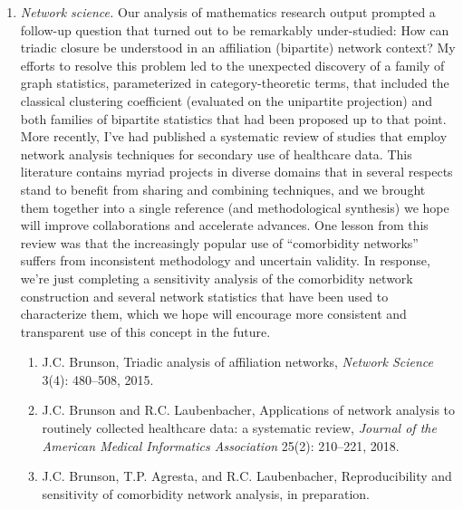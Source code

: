 \documentclass{nihbiosketch}
\begin{document}
\begin{enumerate}
\item \emph{Network science.}
Our analysis of mathematics research output prompted a follow-up question that turned out to be remarkably under-studied: How can triadic closure be understood in an affiliation (bipartite) network context? My efforts to resolve this problem led to the unexpected discovery of a family of graph statistics, parameterized in category-theoretic terms, that included the classical clustering coefficient (evaluated on the unipartite projection) and both families of bipartite statistics that had been proposed up to that point.
More recently, I've had published a systematic review of studies that employ network analysis techniques for secondary use of healthcare data. This literature contains myriad projects in diverse domains that in several respects stand to benefit from sharing and combining techniques, and we brought them together into a single reference (and methodological synthesis) we hope will improve collaborations and accelerate advances.
One lesson from this review was that the increasingly popular use of ``comorbidity networks'' suffers from inconsistent methodology and uncertain validity. In response, we're just completing a sensitivity analysis of the comorbidity network construction and several network statistics that have been used to characterize them, which we hope will encourage more consistent and transparent use of this concept in the future.

\begin{enumerate}
\item J.C. Brunson, Triadic analysis of affiliation networks, \emph{Network Science} 3(4): 480--508, 2015.
\item J.C. Brunson and R.C. Laubenbacher, Applications of network analysis to routinely collected healthcare data: a systematic review, \emph{Journal of the American Medical Informatics Association} 25(2): 210--221, 2018.
\item J.C. Brunson, T.P. Agresta, and R.C. Laubenbacher, Reproducibility and sensitivity of comorbidity network analysis, in preparation.
\end{enumerate}


\end{enumerate}
\end{document}
